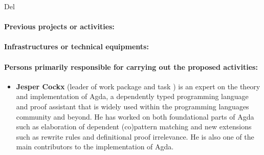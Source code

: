 \begin{sitedescription}{Del}

\paragraph*{Previous projects or activities:}

\paragraph*{Infrastructures or technical equipments:}

\paragraph*{Persons primarily responsible for carrying out the proposed activities:}

\begin{itemize}

  \item{\bf Jesper Cockx} (leader of work package 
  and task ) is an expert on the theory and
  implementation of Agda, a dependently typed programming language and
  proof assistant that is widely used within the programming languages
  community and beyond. He has worked on both foundational parts of
  Agda such as elaboration of dependent (co)pattern matching and new
  extensions such as rewrite rules and definitional proof
  irrelevance. He is also one of the main contributors to the
  implementation of Agda.

\end{itemize}




\end{sitedescription}

